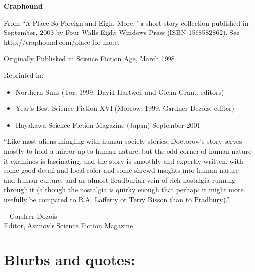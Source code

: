 

\newenvironment{sign}{\begin{center}\scshape}{\end{center}}
\newenvironment{authorof}{\begin{flushright}\sffamily}{\end{flushright}}


\begin{center}
\textbf{\huge\textsf{{Craphound}}}
\end{center}


From ``A Place So Foreign and Eight More,'' a short story
collection published in September, 2003 by Four Walls Eight Windows
Press (ISBN 1568582862). See http://craphound.com/place for more.

Originally Published in Science Fiction Age, March 1998

Reprinted in:

\begin{itemize}
\item Northern Suns 
  (Tor, 1999, David Hartwell and Glenn Grant, editors)

\item Year's Best Science Fiction XVI 
  (Morrow, 1999, Gardner Dozois, editor)

\item Hayakawa Science Fiction Magazine (Japan)
  September 2001
\end{itemize}

``Like most aliens-mingling-with-human-society stories, Doctorow's 
story serves mostly to hold a mirror up to human nature, but the odd 
corner of human nature it examines is fascinating, and the story is 
smoothly and expertly written, with some good detail and local color 
and some shrewd insights into human nature and human culture, and an 
almost Bradburian vein of rich nostalgia running through it (although 
the nostalgia is quirky enough that perhaps it might more usefully be 
compared to R.A. Lafferty or Terry Bisson than to Bradbury).''

\begin{flushright}
\textsf{-- Gardner Dozois\\ Editor, Asimov's Science Fiction Magazine}
\end{flushright}


\section{Blurbs and quotes:}

